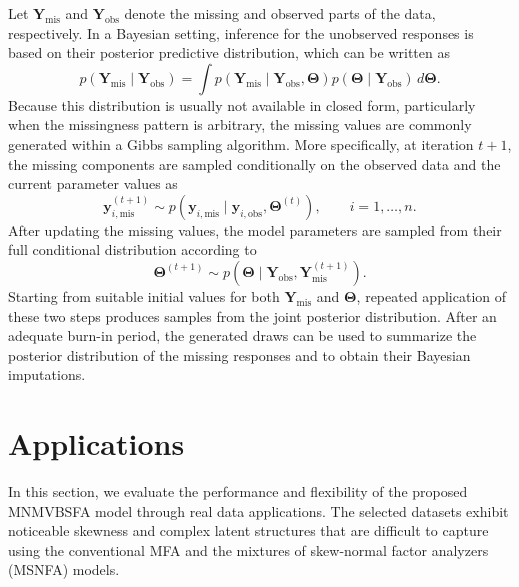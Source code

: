 \documentclass[twoside]{article}
\theoremstyle{definition}
\begin{document}
Let $\mathbf{Y}_{\mathrm{mis}}$ and $\mathbf{Y}_{\mathrm{obs}}$ denote the missing and observed parts of the data, respectively. In a Bayesian setting, inference for the unobserved responses is based on their posterior predictive distribution, which can be written as
\[
p(\mathbf{Y}_{\mathrm{mis}} \mid \mathbf{Y}_{\mathrm{obs}})
=
\int 
p(\mathbf{Y}_{\mathrm{mis}} \mid \mathbf{Y}_{\mathrm{obs}}, \boldsymbol{\Theta})
p(\boldsymbol{\Theta} \mid \mathbf{Y}_{\mathrm{obs}})
\, d\boldsymbol{\Theta}.
\]
Because this distribution is usually not available in closed form, particularly when the missingness pattern is arbitrary, the missing values are commonly generated within a Gibbs sampling algorithm. More specifically, at iteration $t+1$, the missing components are sampled conditionally on the observed data and the current parameter values as
\[
\mathbf{y}_{i,\mathrm{mis}}^{(t+1)}
\sim
p\left(
\mathbf{y}_{i,\mathrm{mis}}
\mid
\mathbf{y}_{i,\mathrm{obs}},
\boldsymbol{\Theta}^{(t)}
\right),
\qquad i=1,\ldots,n.
\]
After updating the missing values, the model parameters are sampled from their full conditional distribution according to
\[
\boldsymbol{\Theta}^{(t+1)}
\sim
p\left(
\boldsymbol{\Theta}
\mid
\mathbf{Y}_{\mathrm{obs}},
\mathbf{Y}_{\mathrm{mis}}^{(t+1)}
\right).
\]
Starting from suitable initial values for both $\mathbf{Y}_{\mathrm{mis}}$ and $\boldsymbol{\Theta}$, repeated application of these two steps produces samples from the joint posterior distribution. After an adequate burn-in period, the generated draws can be used to summarize the posterior distribution of the missing responses and to obtain their Bayesian imputations.
\section{Applications}
\vspace{-0.5cm}
In this section, we evaluate the performance and flexibility of the proposed MNMVBSFA model through real data applications. The selected datasets exhibit noticeable skewness and complex latent structures that are difficult to capture using the conventional MFA and the mixtures of skew-normal factor analyzers (MSNFA) models.
\end{document}
